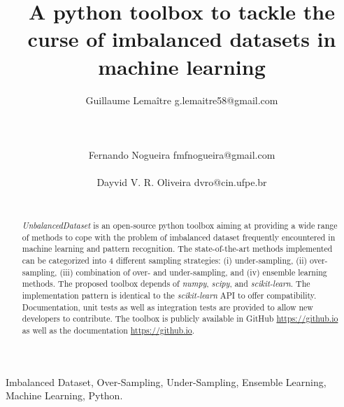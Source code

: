 \documentclass[twoside,11pt]{article}
\begin{document}
\title{A python toolbox to tackle the curse of imbalanced datasets in machine learning}
\author{Guillaume Lema\^itre \email g.lemaitre58@gmail.com \\ 
     \\ 
     \\ 
     \\ 
        \AND
        Fernando Nogueira \email fmfnogueira@gmail.com \\ 
         \\ 
        \AND
        Dayvid V. R. Oliveira \email dvro@cin.ufpe.br \\ 
         \\ 
        } 
\editor{-}

\maketitle

\begin{abstract}
\emph{UnbalancedDataset} is an open-source python toolbox aiming at providing a wide range of methods to cope with the problem of imbalanced dataset frequently encountered in machine learning and pattern recognition.
The state-of-the-art methods implemented can be categorized into 4 different sampling strategies: (i) under-sampling, (ii) over-sampling, (iii) combination of over- and under-sampling, and (iv) ensemble learning methods.
The proposed toolbox depends of \emph{numpy}, \emph{scipy}, and \emph{scikit-learn}.
The implementation pattern is identical to the \emph{scikit-learn} API to offer compatibility.
Documentation, unit tests as well as integration tests are provided to allow new developers to contribute.
The toolbox is publicly available in GitHub \url{https://github.io} as well as the documentation \url{https://github.io}.
\end{abstract}

\begin{keywords}
Imbalanced Dataset, Over-Sampling, Under-Sampling, Ensemble Learning, Machine Learning, Python.
\end{keywords}
\end{document}
